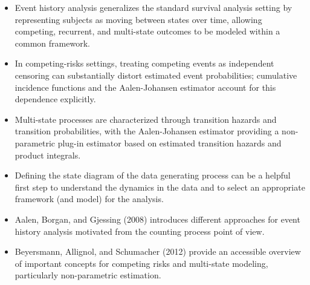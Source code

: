 \documentclass[
  letterpaper,
  krantz2]{style/krantz}
\providecommand{\tightlist}{%
  \setlength{\itemsep}{0pt}\setlength{\parskip}{0pt}}
\begin{document}
\begin{tcolorbox}[enhanced jigsaw, toprule=.15mm, bottomtitle=1mm, opacityback=0, breakable, leftrule=.75mm, title={Key takeaways}, toptitle=1mm, bottomrule=.15mm, colback=white, colframe=quarto-callout-warning-color-frame, titlerule=0mm, opacitybacktitle=0.6, coltitle=black, rightrule=.15mm, left=2mm, colbacktitle=quarto-callout-warning-color!10!white, arc=.35mm]

\begin{itemize}
\tightlist
\item
  Event history analysis generalizes the standard survival analysis
  setting by representing subjects as moving between states over time,
  allowing competing, recurrent, and multi-state outcomes to be modeled
  within a common framework.
\item
  In competing-risks settings, treating competing events as independent
  censoring can substantially distort estimated event probabilities;
  cumulative incidence functions and the Aalen-Johansen estimator
  account for this dependence explicitly.
\item
  Multi-state processes are characterized through transition hazards and
  transition probabilities, with the Aalen-Johansen estimator providing
  a non-parametric plug-in estimator based on estimated transition
  hazards and product integrals.
\item
  Defining the state diagram of the data generating process can be a
  helpful first step to understand the dynamics in the data and to
  select an appropriate framework (and model) for the analysis.
\end{itemize}

\end{tcolorbox}

\begin{tcolorbox}[enhanced jigsaw, toprule=.15mm, bottomtitle=1mm, opacityback=0, breakable, leftrule=.75mm, title={Further reading}, toptitle=1mm, bottomrule=.15mm, colback=white, colframe=quarto-callout-tip-color-frame, titlerule=0mm, opacitybacktitle=0.6, coltitle=black, rightrule=.15mm, left=2mm, colbacktitle=quarto-callout-tip-color!10!white, arc=.35mm]

\begin{itemize}
\tightlist
\item
  Aalen, Borgan, and Gjessing (2008) introduces different approaches for
  event history analysis motivated from the counting process point of
  view.
\item
  Beyersmann, Allignol, and Schumacher (2012) provide an accessible
  overview of important concepts for competing risks and multi-state
  modeling, particularly non-parametric estimation.
\end{itemize}

\end{tcolorbox}
\end{document}
